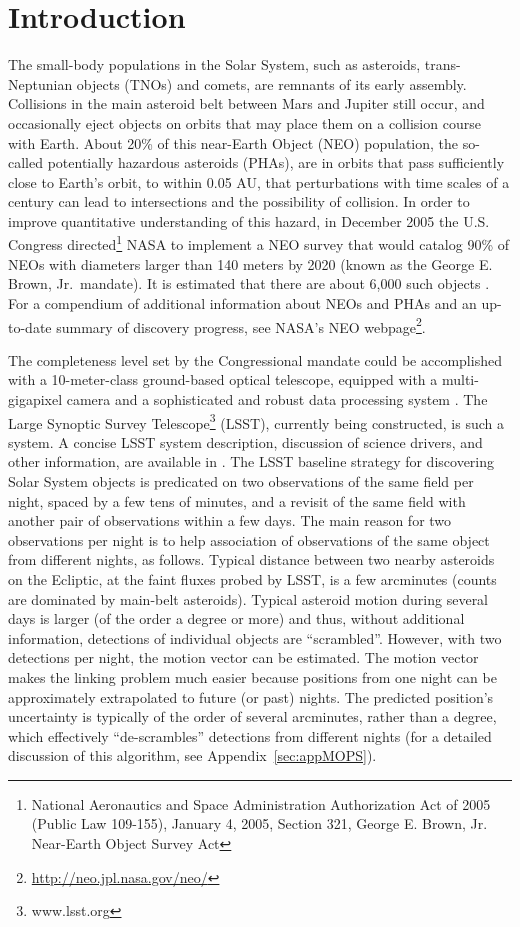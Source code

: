 
\section{Introduction}

The small-body populations in the Solar System, such as asteroids, trans-Neptunian objects (TNOs)
and comets, are remnants of its early assembly. Collisions in the main asteroid belt between Mars and
Jupiter still occur, and occasionally eject objects on orbits that may place them on a collision course
with Earth. About 20\% of this near-Earth Object (NEO) population, the so-called potentially hazardous
asteroids (PHAs), are in orbits that pass sufficiently close to Earth's orbit, to within 0.05 AU, that
perturbations with time scales of a century can lead to intersections and the possibility of collision.
In order to improve quantitative understanding of this hazard, in December 2005 the U.S. Congress
directed\footnote{National Aeronautics and Space Administration Authorization Act of 2005 (Public Law 109-155), January 4, 2005, Section 321, George E. Brown, Jr. Near-Earth Object Survey Act} NASA to implement a NEO survey that
would catalog 90\% of NEOs with diameters larger than 140 meters by 2020 (known as the George
E. Brown, Jr.\ mandate). It is estimated that there are about 6,000 such objects \citep{harris15}.
For a compendium of additional information about NEOs and PHAs and an up-to-date summary of
discovery progress, see NASA's NEO webpage\footnote{\url{http://neo.jpl.nasa.gov/neo/}}.

The completeness level set by the Congressional mandate could be accomplished with a 10-meter-class
ground-based optical telescope, equipped with a multi-gigapixel camera and a sophisticated and robust data
processing system \citep[see NASA-commissioned reports by ][]{stokes03,shapiro10}. The Large Synoptic Survey Telescope\footnote{www.lsst.org} (LSST), currently being
constructed, is such a system. A concise LSST system description, discussion of science drivers, and other
information, are available in \cite{LSSToverview}. The LSST baseline strategy for discovering Solar System
objects is predicated on two observations of the same field per night, spaced by a few tens of minutes, and
a revisit of the same field with another pair of observations within a few days. The main reason for two
observations per night is to help association of observations of the same object from different nights,
as follows. Typical distance between two nearby asteroids on the Ecliptic, at the faint fluxes probed by
LSST, is a few arcminutes (counts are dominated by main-belt asteroids). Typical asteroid motion
during several days is larger (of the order a degree or more) and thus, without additional information,
detections of individual objects are ``scrambled''. However, with two detections per night, the motion
vector can be estimated. The motion vector makes the linking problem much easier because
positions from one night can be approximately extrapolated to future (or past) nights. The predicted
position's uncertainty is typically of the order of several arcminutes, rather than a degree, which effectively
``de-scrambles'' detections from different nights (for a detailed discussion of this algorithm, see
Appendix~\ref{sec:appMOPS}).

